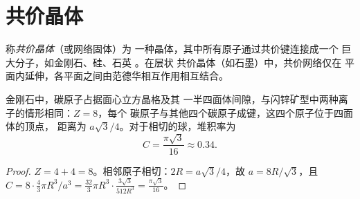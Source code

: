 \section{共价晶体}

\begin{definition}[共价晶体]\label{def:b1:crystals-ionic-covalent:covalent-crystal}
称\emph{共价晶体}（或网络固体）为
一种晶体，其中所有原子通过共价键连接成一个
巨大分子，如金刚石、硅、石英 。在层状
共价晶体（如石墨）中，共价网络仅在
平面内延伸，各平面之间由范德华相互作用相互结合。
\end{definition}

\begin{proposition}[金刚石结构]\label{prop:b1:crystals-ionic-covalent:diamond}
金刚石中，碳原子占据面心立方晶格及其
一半四面体间隙，与闪锌矿型中两种离子的情形相同：$Z = 8$，每个
碳原子与其他四个碳原子成键，这四个原子位于四面体的顶点，
距离为 $a\sqrt3/4$。对于相切的球，堆积率为
\[
  C = \frac{\pi\sqrt3}{16} \approx 0.34 .
\]
\end{proposition}

\begin{proof}
$Z = 4 + 4 = 8$。相邻原子相切：$2R = a\sqrt3/4$，故 $a =
8R/\sqrt3$，且 $C = 8 \cdot \frac43\pi R^3/a^3 = \frac{32}{3}\pi R^3 \cdot
\frac{3\sqrt3}{512 R^3} = \frac{\pi\sqrt3}{16}$。
\end{proof}

